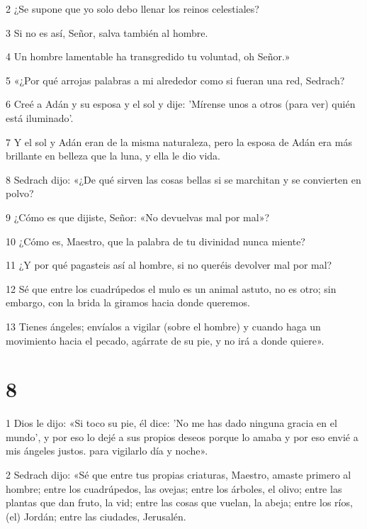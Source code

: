 \par 2 ¿Se supone que yo solo debo llenar los reinos celestiales?

\par 3 Si no es así, Señor, salva también al hombre.

\par 4 Un hombre lamentable ha transgredido tu voluntad, oh Señor.»

\par 5 «¿Por qué arrojas palabras a mi alrededor como si fueran una red, Sedrach?

\par 6 Creé a Adán y su esposa y el sol y dije: 'Mírense unos a otros (para ver) quién está iluminado'.

\par 7 Y el sol y Adán eran de la misma naturaleza, pero la esposa de Adán era más brillante en belleza que la luna, y ella le dio vida.

\par 8 Sedrach dijo: «¿De qué sirven las cosas bellas si se marchitan y se convierten en polvo?

\par 9 ¿Cómo es que dijiste, Señor: «No devuelvas mal por mal»?

\par 10 ¿Cómo es, Maestro, que la palabra de tu divinidad nunca miente?

\par 11 ¿Y por qué pagasteis así al hombre, si no queréis devolver mal por mal?

\par 12 Sé que entre los cuadrúpedos el mulo es un animal astuto, no es otro; sin embargo, con la brida la giramos hacia donde queremos.

\par 13 Tienes ángeles; envíalos a vigilar (sobre el hombre) y cuando haga un movimiento hacia el pecado, agárrate de su pie, y no irá a donde quiere».

\chapter{8}

\par 1 Dios le dijo: «Si toco su pie, él dice: 'No me has dado ninguna gracia en el mundo', y por eso lo dejé a sus propios deseos porque lo amaba y por eso envié a mis ángeles justos. para vigilarlo día y noche».

\par 2 Sedrach dijo: «Sé que entre tus propias criaturas, Maestro, amaste primero al hombre; entre los cuadrúpedos, las ovejas; entre los árboles, el olivo; entre las plantas que dan fruto, la vid; entre las cosas que vuelan, la abeja; entre los ríos, (el) Jordán; entre las ciudades, Jerusalén.

